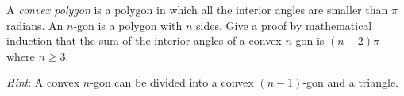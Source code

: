\documentclass[a4paper]{exam}
\begin{document}
\begin{questions}

\question A \textit{convex polygon} is a polygon in which all the interior angles are smaller than $\pi$ radians. An $n$-gon is a polygon with $n$ sides. Give a proof by mathematical induction that the sum of the interior angles of a convex $n$-gon is $(n-2)\pi$ where $n\ge 3$. 

  \textit{Hint}: A convex $n$-gon can be divided into a convex $(n-1)$-gon and a triangle.
  \begin{solution}
  \end{solution}
  

\end{questions}
\end{document}
